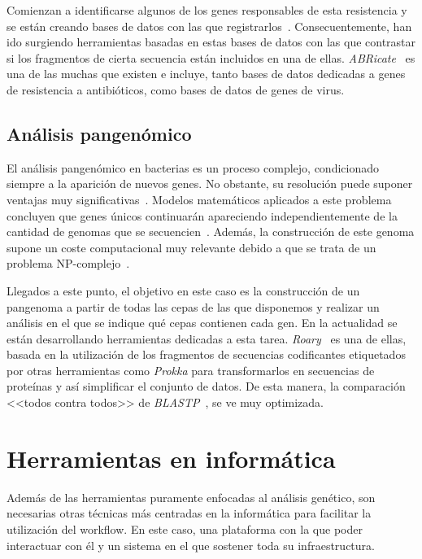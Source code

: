 Comienzan a identificarse algunos de los genes responsables de esta resistencia y se están creando bases de datos con las que registrarlos~\cite{ARDB}. Consecuentemente, han ido surgiendo herramientas basadas en estas bases de datos con las que contrastar si los fragmentos de cierta secuencia están incluidos en una de ellas. \textit{ABRicate}~\cite{seemann_:mag_right:_2019} es una de las muchas que existen e incluye, tanto bases de datos dedicadas a genes de resistencia a antibióticos, como bases de datos de genes de virus.

\subsection{Análisis pangenómico}
El análisis pangenómico en bacterias es un proceso complejo, condicionado siempre a la aparición de nuevos genes. No obstante, su resolución puede suponer ventajas muy significativas~\cite{MEDINI2005589}. Modelos matemáticos aplicados a este problema concluyen que genes únicos continuarán apareciendo independientemente de la cantidad de genomas que se secuencien~\cite{Tettelin13950}. Además, la construcción de este genoma supone un coste computacional muy relevante debido a que se trata de un problema NP-complejo~\cite{Nguyen2015}.

Llegados a este punto, el objetivo en este caso es la construcción de un pangenoma a partir de todas las cepas de las que disponemos y realizar un análisis en el que se indique qué cepas contienen cada gen. En la actualidad se están desarrollando herramientas dedicadas a esta tarea. \textit{Roary}~\cite{Page2015} es una de ellas, basada en la utilización de los fragmentos de secuencias codificantes etiquetados por otras herramientas como \textit{Prokka} para transformarlos en secuencias de proteínas y así simplificar el conjunto de datos. De esta manera, la comparación <<todos contra todos>> de \textit{BLASTP}~\cite{Madden}, se ve muy optimizada.

\section{Herramientas en informática}
Además de las herramientas puramente enfocadas al análisis genético, son necesarias otras técnicas más centradas en la informática para facilitar la utilización del workflow. En este caso, una plataforma con la que poder interactuar con él y un sistema en el que sostener toda su infraestructura.
